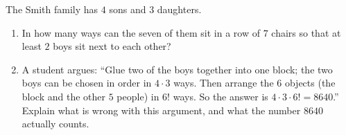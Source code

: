 The Smith family has $4$ sons and $3$ daughters.
\begin{enumerate}
\item[(a)] In how many ways can the seven of them sit in a row of $7$ chairs so that at least $2$ boys sit next to each other?
\item[(b)] A student argues: ``Glue two of the boys together into one block; the two boys can be chosen in order in $4\cdot3$ ways. Then arrange the $6$ objects (the block and the other $5$ people) in $6!$ ways. So the answer is $4\cdot3\cdot6!=8640$.'' Explain what is wrong with this argument, and what the number $8640$ actually counts.
\end{enumerate}
